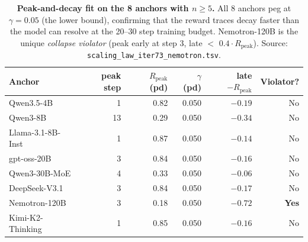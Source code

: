 \begin{table}[t]
  \centering
  \small
  \begin{tabular}{lrrrrr}
    \toprule
    Anchor & peak step & $R_\mathrm{peak}$ (pd) & $\gamma$ (pd) & late $ - R_\mathrm{peak}$ & Violator? \\
    \midrule
      Qwen3.5-4B            &  1 & 0.82 & 0.050 & $-0.19$ & No \\
      Qwen3-8B              & 13 & 0.29 & 0.050 & $-0.34$ & No \\
      Llama-3.1-8B-Inst     &  1 & 0.87 & 0.050 & $-0.14$ & No \\
      gpt-oss-20B           &  3 & 0.84 & 0.050 & $-0.16$ & No \\
      Qwen3-30B-MoE         &  4 & 0.33 & 0.050 & $-0.06$ & No \\
      DeepSeek-V3.1         &  3 & 0.84 & 0.050 & $-0.17$ & No \\
      Nemotron-120B         &  3 & 0.18 & 0.050 & $-0.72$ & \textbf{Yes} \\
      Kimi-K2-Thinking      &  1 & 0.85 & 0.050 & $-0.16$ & No \\
    \bottomrule
  \end{tabular}
  \caption{\textbf{Peak-and-decay fit on the 8 anchors with $n \geq 5$.}
    All 8 anchors peg at $\gamma = 0.05$ (the lower bound),
    confirming that the reward traces decay faster than the
    model can resolve at the 20--30 step training budget.
    Nemotron-120B is the unique \emph{collapse violator}
    (peak early at step 3, late $<$ $0.4 \cdot R_\mathrm{peak}$).
    Source: \texttt{scaling\_law\_iter73\_nemotron.tsv}.}
  \label{tab:iter73-nemotron}
\end{table}